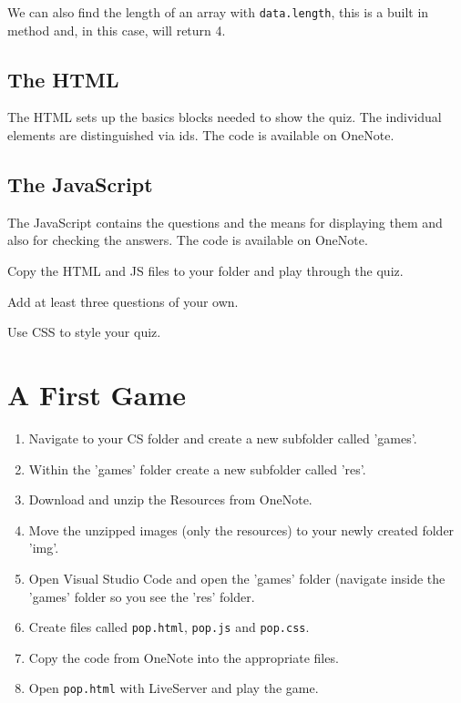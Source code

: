 \documentclass[11pt,a4paper]{report}
\begin{document}
We can also find the length of an array with \verb|data.length|, this is a built in method and, in this case, will return 4.

\subsection{The HTML}
The HTML sets up the basics blocks needed to show the quiz. The individual elements are distinguished via ids. The code is available on OneNote.

\subsection{The JavaScript}
The JavaScript contains the questions and the means for displaying them and also for checking the answers. The code is available on OneNote.


\begin{ex}
Copy the HTML and JS files to your folder and play through the quiz.
\end{ex}

\begin{ex}
Add at least three questions of your own.
\end{ex}

\begin{ex}
Use CSS to style your quiz.
\end{ex}

\newpage

\section{A First Game}

\begin{ex}
\begin{enumerate}
\item Navigate to your CS folder and create a new subfolder called 'games'.
\item Within the 'games' folder create a new subfolder called 'res'.
\item Download and unzip the Resources from OneNote.
\item Move the unzipped images (only the resources) to your newly created folder 'img'.
\item Open Visual Studio Code and open the 'games' folder (navigate inside the 'games' folder so you see the 'res' folder.
\item Create files called \verb|pop.html|, \verb|pop.js| and \verb|pop.css|.
\item Copy the code from OneNote into the appropriate files. 
\item Open \verb|pop.html| with LiveServer and play the game.
\end{enumerate}
\end{ex}
\end{document}
